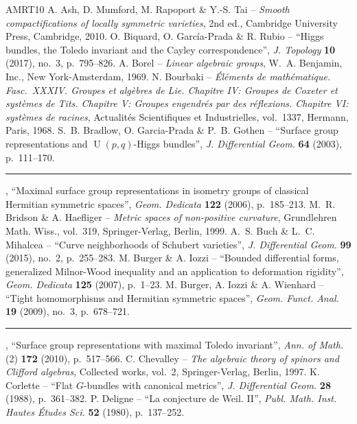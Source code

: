 \begin{thebibliography}{AMRT10}
 A. Ash, D. Mumford, M. Rapoport \& Y.-S. Tai -- \emph{Smooth compactifications of locally symmetric varieties}, 2nd ed., Cambridge University Press, Cambridge, 2010.
 O. Biquard, O. García-Prada \& R. Rubio -- ``Higgs bundles, the Toledo invariant and the Cayley correspondence'', \emph{J. Topology} \textbf{10} (2017), no.~3, p.~795--826.
 A. Borel -- \emph{Linear algebraic groups}, W.~A. Benjamin, Inc., New York-Amsterdam, 1969.
 N. Bourbaki -- \emph{Éléments de mathématique. Fasc.~XXXIV. Groupes et algèbres de Lie. Chapitre IV: Groupes de Coxeter et systèmes de Tits. Chapitre V: Groupes engendrés par des réflexions. Chapitre VI: systèmes de racines}, Actualités Scientifiques et Industrielles, vol.~1337, Hermann, Paris, 1968.
 S.~B. Bradlow, O. Garcia-Prada \& P.~B. Gothen -- ``Surface group representations and $\operatorname U(p,q)$-Higgs bundles'', \emph{J. Differential Geom.} \textbf{64} (2003), p.~111--170.
 \rule{1.2em}{.1pt}, ``Maximal surface group representations in isometry groups of classical Hermitian symmetric spaces'', \emph{Geom. Dedicata} \textbf{122} (2006), p.~185--213.
 M.~R. Bridson \& A. Haefliger -- \emph{Metric spaces of non-positive curvature}, Grundlehren Math. Wiss., vol.~319, Springer-Verlag, Berlin, 1999.
 A.~S. Buch \& L.~C. Mihalcea -- ``Curve neighborhoods of Schubert varieties'', \emph{J. Differential Geom.} \textbf{99} (2015), no.~2, p.~255--283.
 M. Burger \& A. Iozzi -- ``Bounded differential forms, generalized Milnor-Wood inequality and an application to deformation rigidity'', \emph{Geom. Dedicata} \textbf{125} (2007), p.~1--23.
 M. Burger, A. Iozzi \& A. Wienhard -- ``Tight homomorphisms and Hermitian symmetric spaces'', \emph{Geom. Funct. Anal.} \textbf{19} (2009), no.~3, p.~678--721.
 \rule{1.2em}{.1pt}, ``Surface group representations with maximal Toledo invariant'', \emph{Ann. of Math.} (2) \textbf{172} (2010), p.~517--566.
 C. Chevalley -- \emph{The algebraic theory of spinors and Clifford algebras}, Collected works, vol.~2, Springer-Verlag, Berlin, 1997.
 K. Corlette -- ``Flat $G$-bundles with canonical metrics'', \emph{J. Differential Geom.} \textbf{28} (1988), p.~361--382.
 P. Deligne -- ``La conjecture de Weil. II'', \emph{Publ. Math. Inst. Hautes Études Sci.} \textbf{52} (1980), p.~137--252.

\end{thebibliography}
